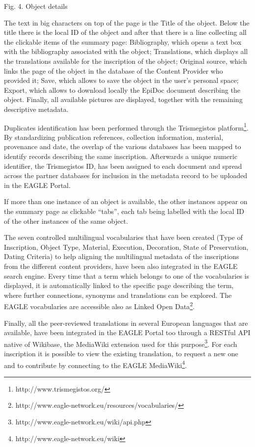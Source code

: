 \documentclass[amsthm,ebook]{saparticle}
\begin{document}
Fig. 4. Object details


\bigskip

The text in big characters on top of the page is the Title of the object. Below the title there is the local ID of the
object and after that there is a line collecting all the clickable items of the summary page: Bibliography, which opens
a text box with the bibliography associated with the object; Translations, which displays all the translations
available for the inscription of the object; Original source, which links the page of the object in the database of the
Content Provider who provided it; Save, which allows to save the object in the user’s personal space; Export, which
allows to download locally the EpiDoc document describing the object. Finally, all available pictures are displayed,
together with the remaining descriptive metadata.

Duplicates identification has been performed through the Trismegistos platform\footnote{ http://www.trismegistos.org/ }.
By standardizing publication references, collection information, material, provenance and date, the overlap of the
various databases has been mapped to identify records describing the same inscription. Afterwards a unique numeric
identifier, the Trismegistos ID, has been assigned to each document and spread across the partner databases for
inclusion in the metadata record to be uploaded in the EAGLE Portal.

If more than one instance of an object is available, the other instances appear on the summary page as clickable “tabs”,
each tab being labelled with the local ID of the other instances of the same object.

The seven controlled multilingual vocabularies that have been created (Type of Inscription, Object Type, Material,
Execution, Decoration, State of Preservation, Dating Criteria) to help aligning the multilingual metadata of the
inscriptions from the different content providers, have been also integrated in the EAGLE search engine. Every time
that a term which belongs to one of the vocabularies is displayed, it is automatically linked to the specific page
describing the term, where further connections, synonyms and translations can be explored. The EAGLE vocabularies are
accessible also as Linked Open Data\footnote{ http://www.eagle-network.eu/resources/vocabularies/}.

Finally, all the peer-reviewed translations in several European languages that are available, have been integrated in
the EAGLE Portal too through a RESTful API native of Wikibase, the MediaWiki extension used for this purpose\footnote{
http://www.eagle-network.eu/wiki/api.php }. For each inscription it is possible to view the existing translation, to
request a new one and to contribute by connecting to the EAGLE MediaWiki\footnote{ http://www.eagle-network.eu/wiki }.
\end{document}
